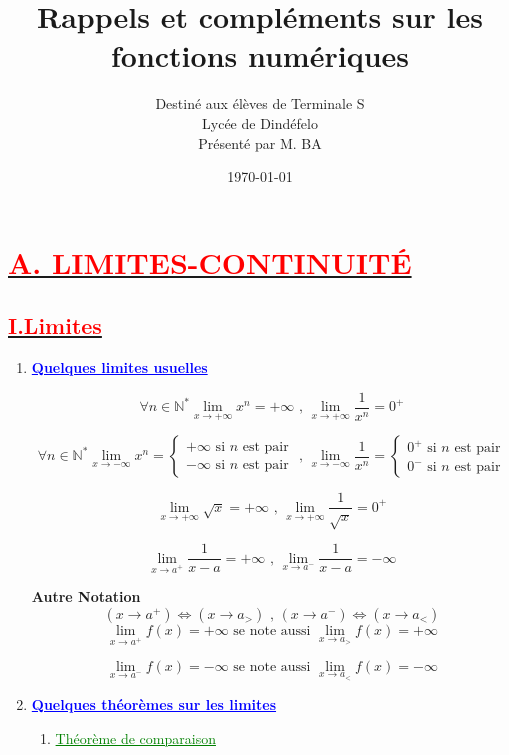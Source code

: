 \documentclass{article}
\author{Destiné aux élèves de Terminale S\\Lycée de Dindéfelo\\Présenté par M. BA}
\title{\textbf{Rappels et compléments sur les fonctions numériques}}
\date{\today}
\begin{document}
\maketitle
\section*{\underline{\textbf{\textcolor{red}{A. LIMITES-CONTINUITÉ}}}}
\subsection*{\underline{\textbf{\textcolor{red}{I.Limites}}}}

\renewcommand{\labelenumi}{\theenumi)}
\begin{enumerate}[label=\arabic*)]
    \item \textbf{\textcolor{blue}{\underline{Quelques limites usuelles}}}
    
\[\forall n\in\mathbb{N}^{*} \lim_{x \to +\infty} x^{n}=+\infty  \text{ , } \lim_{x \to +\infty} \frac{1}{x^{n}}=0^{+}  \]

\[ \forall n\in\mathbb{N}^{*}
 \lim_{x \to -\infty} x^{n} =
 \begin{cases} 
 +\infty \text{ si \(n\) est pair}\\
 -\infty \text{ si \(n\) est pair}
 \end{cases}
\text{ , }
\lim_{x \to -\infty} \frac{1}{x^{n}}=
 \begin{cases} 
 0^{+} \text{ si \(n\) est pair}\\
 0^{-} \text{ si \(n\) est pair}
 \end{cases}
\]

\[ \lim_{x \to +\infty} \sqrt{x}=+\infty \text{ , } \lim_{x \to +\infty} \frac{1}{\sqrt{x}}=0^{+}  \]

\[ \lim_{x \to a^{+}} \frac{1}{x-a}=+\infty \text{ , } \lim_{x \to a^{-}} \frac{1}{x-a}=-\infty  \]

		\textbf{Autre Notation}
\[( x\rightarrow a^{+} ) \Leftrightarrow ( x\rightarrow a_{>} ) \text{ , } ( x\rightarrow a^{-} ) \Leftrightarrow ( x\rightarrow a_{<} ) \]
\[ \lim_{x \to a^{+}} f(x)=+\infty \text{ se note aussi } \lim_{x \to a_{>}} f(x)=+\infty  \]	

\[ \lim_{x \to a^{-}} f(x)=-\infty \text{ se note aussi } \lim_{x \to a_{<}} f(x)=-\infty  \]	
    
    \item	\textbf{\textcolor{blue}{\underline{Quelques théorèmes sur les limites}}}
\begin{enumerate}[label=\alph*)]
       \item \textcolor{green}{\underline{Théorème de comparaison}}
       

\end{enumerate}
\end{enumerate}
\end{document}
